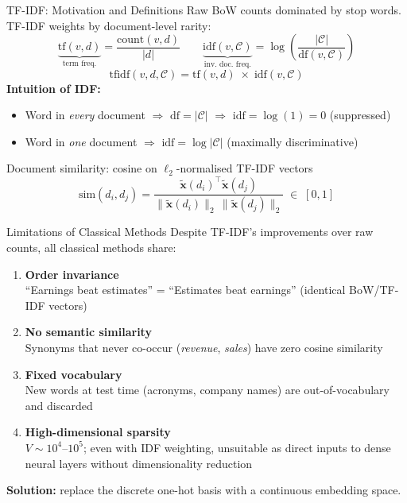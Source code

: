 \documentclass[9pt,t]{beamer}
\begin{document}
\begin{frame}{TF-IDF: Motivation and Definitions}
  Raw BoW counts dominated by stop words. TF-IDF weights by document-level rarity:
  \medskip
  \[
    \underbrace{\mathrm{tf}(v, d)}_{\text{term freq.}}
    = \frac{\mathrm{count}(v,d)}{|d|}
    \qquad
    \underbrace{\mathrm{idf}(v, \mathcal{C})}_{\text{inv.\ doc.\ freq.}}
    = \log\!\left(\frac{|\mathcal{C}|}{\mathrm{df}(v, \mathcal{C})}\right)
  \]
  \[
    \mathrm{tfidf}(v, d, \mathcal{C}) = \mathrm{tf}(v, d) \;\times\; \mathrm{idf}(v, \mathcal{C})
  \]
  \medskip
  \textbf{Intuition of IDF:}
  \begin{itemize}
    \item Word in \emph{every} document $\Rightarrow$ $\mathrm{df} = |\mathcal{C}|$ $\Rightarrow$
          $\mathrm{idf} = \log(1) = 0$ \quad (suppressed)
    \item Word in \emph{one} document $\Rightarrow$ $\mathrm{idf} = \log|\mathcal{C}|$ \quad (maximally discriminative)
  \end{itemize}
  \medskip
  Document similarity: cosine on $\ell_2$-normalised TF-IDF vectors
  \[
    \mathrm{sim}(d_i, d_j)
    = \frac{\tilde{\mathbf{x}}(d_i)^\top \tilde{\mathbf{x}}(d_j)}
           {\|\tilde{\mathbf{x}}(d_i)\|_2\,\|\tilde{\mathbf{x}}(d_j)\|_2} \;\in\; [0,1]
  \]
\end{frame}

\begin{frame}{Limitations of Classical Methods}
  Despite TF-IDF's improvements over raw counts, all classical methods share:
  \medskip
  \begin{enumerate}
    \item \textbf{Order invariance}\\
          ``Earnings beat estimates'' = ``Estimates beat earnings'' (identical BoW/TF-IDF vectors)
    \medskip
    \item \textbf{No semantic similarity}\\
          Synonyms that never co-occur (\textit{revenue}, \textit{sales}) have zero cosine similarity
    \medskip
    \item \textbf{Fixed vocabulary}\\
          New words at test time (acronyms, company names) are out-of-vocabulary and discarded
    \medskip
    \item \textbf{High-dimensional sparsity}\\
          $V \sim 10^4$--$10^5$; even with IDF weighting, unsuitable as direct inputs to
          dense neural layers without dimensionality reduction
  \end{enumerate}
  \medskip
  \textbf{Solution:} replace the discrete one-hot basis with a continuous embedding space.
\end{frame}
\end{document}
